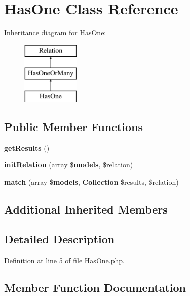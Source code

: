 \section{Has\+One Class Reference}
\label{class_illuminate_1_1_database_1_1_eloquent_1_1_relations_1_1_has_one}
Inheritance diagram for Has\+One\+:\begin{figure}[H]
\begin{center}
\leavevmode
\includegraphics[height=3.000000cm]{class_illuminate_1_1_database_1_1_eloquent_1_1_relations_1_1_has_one}
\end{center}
\end{figure}
\subsection*{Public Member Functions}
\begin{DoxyCompactItemize}
\item 
{\bf get\+Results} ()
\item 
{\bf init\+Relation} (array \${\bf models}, \$relation)
\item 
{\bf match} (array \${\bf models}, {\bf Collection} \$results, \$relation)
\end{DoxyCompactItemize}
\subsection*{Additional Inherited Members}


\subsection{Detailed Description}


Definition at line 5 of file Has\+One.\+php.



\subsection{Member Function Documentation}

